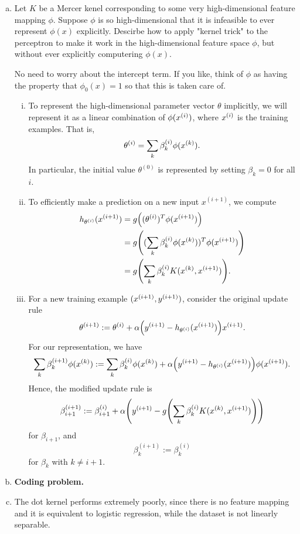 \documentclass[12pt,letterpaper,boxed]{hmcpset}
\begin{document}
\begin{solution}
  \begin{enumerate}[(a)]
    \item Let $K$ be a Mercer kenel corresponding to some very high-dimensional feature mapping $\phi$. Suppose $\phi$ is so high-dimensional that it is infeasible to ever represent $\phi(x)$ explicitly. Descirbe how to apply "kernel trick" to the perceptron to make it work in the high-dimensional feature space $\phi$, but without ever explicitly computering $\phi(x)$.
    
    No need to worry about the intercept term. If you like, think of $\phi$ as having the property that $\phi_0(x) = 1$ so that this is taken care of. 

    \begin{enumerate}[i.]
      \item To represent the high-dimensional parameter vector $\theta$ implicitly, we will represent it as a linear combination of $\phi(\xx)$, where $\xx$ is the training examples. That is,
      \[
      \thth = \sum_k \beta_k^{(i)} \phi(\xx[k]).
      \]
      In particular, the initial value $\theta^{(0)}$ is represented by setting $\beta_k = 0$ for all $i$.

      \item To efficiently make a prediction on a new input $x^{(i+1)}$, we compute
      \[
      \begin{aligned}
        h_{\thth} (x^{(i+1)}) &= g \qty((\thth)^T \phi(x^{(i+1)})) \\
        &= g \qty( (\sum_k \beta_k^{(i)} \phi(x^{(k)}))^T \phi(x^{(i+1)})) \\
        &= g \qty( \sum_k \beta_k^{(i)} K(x^{(k)}, x^{(i+1)})).
      \end{aligned}
      \]

      \item For a new training example $(\xx[i+1], \yy[i+1])$, consider the original update rule
      \[
      \thth[i+1] := \thth + \alpha \qty(\yy[i+1] - h_{\thth}(\xx[i+1])) \xx[i+1].
      \]
      For our representation, we have
      \[
      \sum_k \beta_k^{(i+1)} \phi(\xx[k]) := \sum_k \beta_k^{(i)} \phi(\xx[k]) + \alpha \qty(\yy[i+1] - h_{\thth}(\xx[i+1])) \phi(\xx[i+1]).
      \]
      Hence, the modified update rule is
      \[
      \beta_{i+1}^{(i+1)} := \beta_{i+1}^{(i)} + \alpha \qty(\yy[i+1] - g \qty(\sum_k \beta_k^{(i)} K(\xx[k], \xx[i+1])))
      \]
      for $\beta_{i+1}$, and
      \[
      \beta_k^{(i+1)} := \beta_k^{(i)}
      \]
      for $\beta_k$ with $k \neq i+1$.
    \end{enumerate}

    \item \textbf{Coding problem.}
    \item The dot kernel performs extremely poorly, since there is no feature mapping and it is equivalent to logistic regression, while the dataset is not linearly separable.
  \end{enumerate}
\end{solution}
\end{document}
